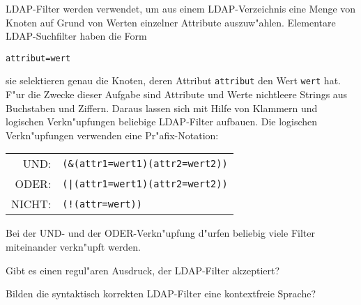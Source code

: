 LDAP-Filter werden verwendet, um aus einem LDAP-Verzeichnis eine Menge
von Knoten auf Grund von Werten einzelner Attribute auszuw"ahlen.
Elementare LDAP-Suchfilter haben die Form
\begin{verbatim}
attribut=wert
\end{verbatim}
sie selektieren genau die Knoten, deren Attribut {\tt attribut}
den Wert {\tt wert} hat.
F"ur die Zwecke dieser Aufgabe sind Attribute und Werte nichtleere
Strings aus Buchstaben und Ziffern. 
Daraus lassen sich
mit Hilfe von Klammern und logischen Verkn"upfungen
beliebige LDAP-Filter aufbauen.
Die logischen Verkn"upfungen verwenden eine Pr"afix-Notation: 
\begin{center}
\begin{tabular}{rl}
UND:&\tt (\&(attr1=wert1)(attr2=wert2))\\
ODER:&\tt (|(attr1=wert1)(attr2=wert2))\\
NICHT:&\tt (!(attr=wert))
\end{tabular}
\end{center}
Bei der UND- und der ODER-Verkn"upfung d"urfen beliebig viele 
Filter miteinander verkn"upft werden.
\begin{teilaufgaben}
\item
Gibt es einen regul"aren Ausdruck, der LDAP-Filter akzeptiert?
\item
Bilden die syntaktisch korrekten LDAP-Filter eine kontextfreie Sprache?
\end{teilaufgaben}


